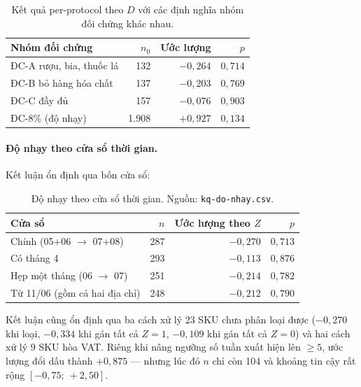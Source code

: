 \documentclass[11pt]{article}
\begin{document}
\begin{table}[htbp]
  \centering
  \caption{Kết quả per-protocol theo $D$ với các định nghĩa nhóm đối chứng khác nhau.}
  \label{tab:per-protocol}
  \begin{tabular}{lrrr}
    \toprule
    Nhóm đối chứng & $n_0$ & Ước lượng & $p$ \\
    \midrule
    ĐC-A rượu, bia, thuốc lá & 132 & $-0{,}264$ & $0{,}714$ \\
    ĐC-B bỏ hàng hóa chất    & 137 & $-0{,}203$ & $0{,}769$ \\
    ĐC-C đầy đủ              & 157 & $-0{,}076$ & $0{,}903$ \\
    ĐC-8\% (độ nhạy)         & 1.908 & $+0{,}927$ & $0{,}134$ \\
    \bottomrule
  \end{tabular}
\end{table}

\paragraph{Độ nhạy theo cửa sổ thời gian.} Kết luận ổn định qua bốn cửa sổ:

\begin{table}[htbp]
  \centering
  \caption{Độ nhạy theo cửa sổ thời gian. Nguồn: \texttt{kq-do-nhay.csv}.}
  \label{tab:do-nhay-cua-so}
  \begin{tabular}{lrrr}
    \toprule
    Cửa sổ & $n$ & Ước lượng theo $Z$ & $p$ \\
    \midrule
    Chính (05+06 $\to$ 07+08)         & 287 & $-0{,}270$ & $0{,}713$ \\
    Có tháng 4                        & 293 & $-0{,}113$ & $0{,}876$ \\
    Hẹp một tháng (06 $\to$ 07)       & 251 & $-0{,}214$ & $0{,}782$ \\
    Từ 11/06 (gồm cả hai địa chỉ)     & 248 & $-0{,}212$ & $0{,}790$ \\
    \bottomrule
  \end{tabular}
\end{table}

Kết luận cũng ổn định qua ba cách xử lý 23 SKU chưa phân loại được ($-0{,}270$ khi loại,
$-0{,}334$ khi gán tất cả $Z=1$, $-0{,}109$ khi gán tất cả $Z=0$) và hai cách xử lý 9 SKU hòa VAT.
Riêng khi nâng ngưỡng số tuần xuất hiện lên $\ge 5$, ước lượng đổi dấu thành $+0{,}875$ --- nhưng
lúc đó $n$ chỉ còn 104 và khoảng tin cậy rất rộng $[-0{,}75;\ +2{,}50]$.

\end{document}

